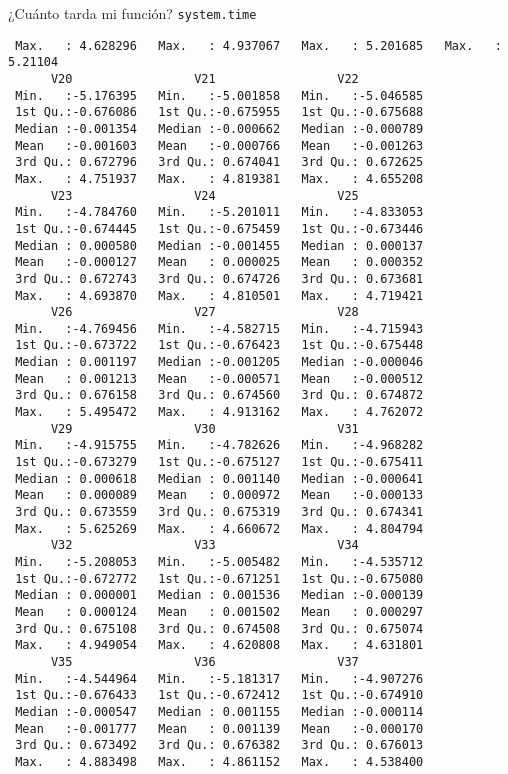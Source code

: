 \documentclass[xcolor={usenames,svgnames,dvipsnames}]{beamer}
\begin{document}
\begin{frame}[label={sec:org4ea8038},fragile]{¿Cuánto tarda mi función? \texttt{system.time}}
\begin{verbatim}
 Max.   : 4.628296   Max.   : 4.937067   Max.   : 5.201685   Max.   : 5.21104  
      V20                 V21                 V22           
 Min.   :-5.176395   Min.   :-5.001858   Min.   :-5.046585  
 1st Qu.:-0.676086   1st Qu.:-0.675955   1st Qu.:-0.675688  
 Median :-0.001354   Median :-0.000662   Median :-0.000789  
 Mean   :-0.001603   Mean   :-0.000766   Mean   :-0.001263  
 3rd Qu.: 0.672796   3rd Qu.: 0.674041   3rd Qu.: 0.672625  
 Max.   : 4.751937   Max.   : 4.819381   Max.   : 4.655208  
      V23                 V24                 V25           
 Min.   :-4.784760   Min.   :-5.201011   Min.   :-4.833053  
 1st Qu.:-0.674445   1st Qu.:-0.675459   1st Qu.:-0.673446  
 Median : 0.000580   Median :-0.001455   Median : 0.000137  
 Mean   :-0.000127   Mean   : 0.000025   Mean   : 0.000352  
 3rd Qu.: 0.672743   3rd Qu.: 0.674726   3rd Qu.: 0.673681  
 Max.   : 4.693870   Max.   : 4.810501   Max.   : 4.719421  
      V26                 V27                 V28           
 Min.   :-4.769456   Min.   :-4.582715   Min.   :-4.715943  
 1st Qu.:-0.673722   1st Qu.:-0.676423   1st Qu.:-0.675448  
 Median : 0.001197   Median :-0.001205   Median :-0.000046  
 Mean   : 0.001213   Mean   :-0.000571   Mean   :-0.000512  
 3rd Qu.: 0.676158   3rd Qu.: 0.674560   3rd Qu.: 0.674872  
 Max.   : 5.495472   Max.   : 4.913162   Max.   : 4.762072  
      V29                 V30                 V31           
 Min.   :-4.915755   Min.   :-4.782626   Min.   :-4.968282  
 1st Qu.:-0.673279   1st Qu.:-0.675127   1st Qu.:-0.675411  
 Median : 0.000618   Median : 0.001140   Median :-0.000641  
 Mean   : 0.000089   Mean   : 0.000972   Mean   :-0.000133  
 3rd Qu.: 0.673559   3rd Qu.: 0.675319   3rd Qu.: 0.674341  
 Max.   : 5.625269   Max.   : 4.660672   Max.   : 4.804794  
      V32                 V33                 V34           
 Min.   :-5.208053   Min.   :-5.005482   Min.   :-4.535712  
 1st Qu.:-0.672772   1st Qu.:-0.671251   1st Qu.:-0.675080  
 Median : 0.000001   Median : 0.001536   Median :-0.000139  
 Mean   : 0.000124   Mean   : 0.001502   Mean   : 0.000297  
 3rd Qu.: 0.675108   3rd Qu.: 0.674508   3rd Qu.: 0.675074  
 Max.   : 4.949054   Max.   : 4.620808   Max.   : 4.631801  
      V35                 V36                 V37           
 Min.   :-4.544964   Min.   :-5.181317   Min.   :-4.907276  
 1st Qu.:-0.676433   1st Qu.:-0.672412   1st Qu.:-0.674910  
 Median :-0.000547   Median : 0.001155   Median :-0.000114  
 Mean   :-0.001777   Mean   : 0.001139   Mean   :-0.000170  
 3rd Qu.: 0.673492   3rd Qu.: 0.676382   3rd Qu.: 0.676013  
 Max.   : 4.883498   Max.   : 4.861152   Max.   : 4.538400  

\end{verbatim}
\end{frame}
\end{document}
